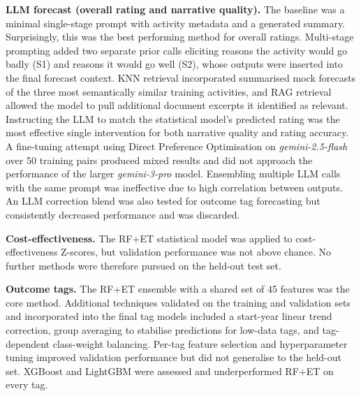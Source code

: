 \textbf{LLM forecast (overall rating and narrative quality).}
The baseline was a minimal single-stage prompt with activity metadata and a generated summary. Surprisingly, this was the best performing method for overall ratings.
Multi-stage prompting added two separate prior calls eliciting reasons the activity would go badly (S1) and reasons it would go well (S2), whose outputs were inserted into the final forecast context.
KNN retrieval incorporated summarised mock forecasts of the three most semantically similar training activities, and RAG retrieval allowed the model to pull additional document excerpts it identified as relevant.
Instructing the LLM to match the statistical model's predicted rating was the most effective single intervention for both narrative quality and rating accuracy.
A fine-tuning attempt using Direct Preference Optimisation on \emph{gemini-2.5-flash} over 50 training pairs produced mixed results and did not approach the performance of the larger \emph{gemini-3-pro} model.
Ensembling multiple LLM calls with the same prompt was ineffective due to high correlation between outputs.
An LLM correction blend was also tested for outcome tag forecasting but consistently decreased performance and was discarded.

\textbf{Cost-effectiveness.}
The RF+ET statistical model was applied to cost-effectiveness Z-scores, but validation performance was not above chance.
No further methods were therefore pursued on the held-out test set.

\textbf{Outcome tags.}
The RF+ET ensemble with a shared set of 45 features was the core method.
Additional techniques validated on the training and validation sets and incorporated into the final tag models included a start-year linear trend correction, group averaging to stabilise predictions for low-data tags, and tag-dependent class-weight balancing.
Per-tag feature selection and hyperparameter tuning improved validation performance but did not generalise to the held-out set.
XGBoost and LightGBM were assessed and underperformed RF+ET on every tag.

